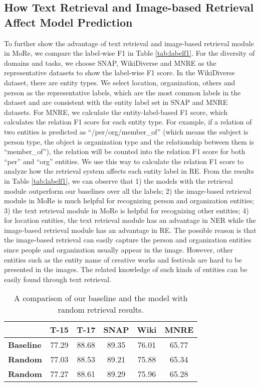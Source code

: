 \documentclass[11pt]{article}
\begin{document}
\subsection{How Text Retrieval and Image-based Retrieval Affect Model Prediction}
To further show the advantage of text retrieval and image-based retrieval module in MoRe, we compare the label-wise F1 in Table \ref{tab:labelf1}. For the diversity of domains and tasks, we choose SNAP, WikiDiverse and MNRE as the representative datasets to show the label-wise F1 score. In the WikiDiverse dataset, there are  entity types. We select location, organization, others and person as the representative labels, which are the most common labels in the dataset and are consistent with the entity label set in SNAP and MNRE datasets. For MNRE, we calculate the entity-label-based F1 score, which calculates the relation F1 score for each entity type. For example, if a relation of two entities is predicted as ``/per/org/member\_of'' (which means the subject is person type, the object is organization type and the relationship between them is ``member\_of''), the relation will be counted into the relation F1 score for both ``per'' and ``org'' entities. We use this way to calculate the relation F1 score to analyze how the retrieval system affects each entity label in RE. From the results in Table \ref{tab:labelf1}, we can observe that 1) the models with the retrieval module outperform our baselines over all the labels; 2) the image-based retrieval module in MoRe is much helpful for recognizing person and organization entities; 3) the text retrieval module in MoRe is helpful for recognizing other entities; 4) for location entities, the text retrieval module has an advantage in NER while the image-based retrieval module has an advantage in RE. The possible reason is that the image-based retrieval can easily capture the person and organization entities since people and organization usually appear in the image. However, other entities such as the entity name of creative works and festivals are hard to be presented in the images. The related knowledge of such kinds of entities can be easily found through text retrieval. 

\begin{table}[t!]
\small
\setlength\tabcolsep{4pt}
\centering
\begin{tabular}{l|ccccc}
\toprule
& T-15 & T-17 & SNAP  & Wiki & MNRE    \\
\midrule
\textbf{Baseline}      & 77.29 & 88.68 & 89.35 & 76.01 & 65.77 \\
\textbf{Random}  & 77.03 & 88.53 & 89.21 & 75.88 & 65.34 \\
\textbf{Random} & 77.27 & 88.61 & 89.29 & 75.96 & 65.28 \\
\bottomrule
\end{tabular}
\caption{A comparison of our baseline and the model with random retrieval results.}
\label{tab:random}
\end{table}
\end{document}
